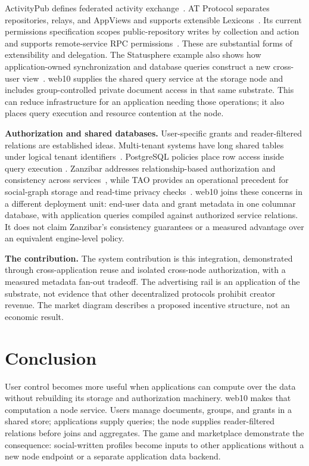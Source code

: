\documentclass[sigconf, nonacm]{acmart}
\begin{document}
ActivityPub defines federated activity exchange~\cite{activitypub2018}.
AT Protocol separates repositories, relays, and AppViews and supports
extensible Lexicons~\cite{kleppmann2024}. Its current permissions
specification scopes public-repository writes by collection and action
and supports remote-service RPC permissions~\cite{at-permissions}.
These are substantial forms of extensibility and delegation. The
Statusphere example also shows how application-owned synchronization
and database queries construct a new cross-user view~\cite{at-statusphere}.
web10 supplies the shared query service at the storage node and includes
group-controlled private document access in that same substrate. This
can reduce infrastructure for an application needing those operations;
it also places query execution and resource contention at the node.

\textbf{Authorization and shared databases.}
User-specific grants and reader-filtered relations are established
ideas. Multi-tenant systems have long shared tables under logical
tenant identifiers~\cite{force2009,aulbach2008,jacobs2007}.
PostgreSQL policies place row access inside query execution
\cite{postgres-rls}. Zanzibar addresses relationship-based authorization
and consistency across services~\cite{zanzibar2019}, while TAO provides
an operational precedent for social-graph storage and read-time privacy
checks~\cite{tao2013}. web10 joins these concerns in a different
deployment unit: end-user data and grant metadata in one columnar
database, with application queries compiled against authorized service
relations. It does not claim Zanzibar's consistency guarantees or a
measured advantage over an equivalent engine-level policy.

\textbf{The contribution.} The system contribution is this integration,
demonstrated through cross-application reuse and isolated cross-node
authorization, with a measured metadata fan-out tradeoff. The advertising
rail is an application of the substrate, not evidence that other
decentralized protocols prohibit creator revenue. The market diagram
describes a proposed incentive structure, not an economic result.

\section{Conclusion}
\label{sec:conclusion}

User control becomes more useful when applications can compute over
the data without rebuilding its storage and authorization machinery.
web10 makes that computation a node service. Users manage documents,
groups, and grants in a shared store; applications supply queries;
the node supplies reader-filtered relations before joins and aggregates.
The game and marketplace demonstrate the consequence: social-written
profiles become inputs to other applications without a new node endpoint
or a separate application data backend.
\end{document}
